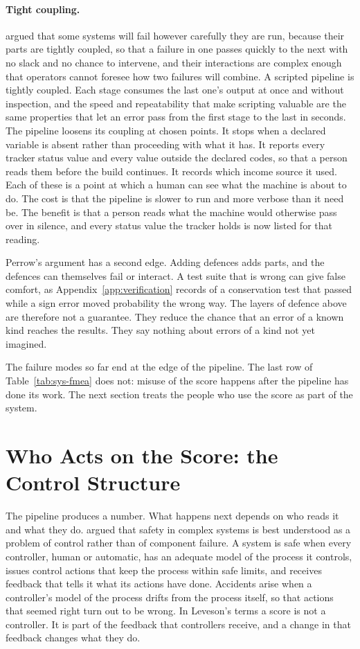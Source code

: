 \paragraph{Tight coupling.} \citet{perrow_1984} argued that some systems will
fail however carefully they are run, because their parts are tightly coupled,
so that a failure in one passes quickly to the next with no slack and no
chance to intervene, and their interactions are complex enough that operators
cannot foresee how two failures will combine. A scripted pipeline is tightly
coupled. Each stage consumes the last one's output at once and without
inspection, and the speed and repeatability that make scripting valuable are
the same properties that let an error pass from the first stage to the last
in seconds. The pipeline loosens its coupling at chosen points. It stops when
a declared variable is absent rather than proceeding with what it has. It
reports every tracker status value and every value outside the declared codes,
so that a person reads them before the build continues. It records which
income source it used. Each of these is a point at which a human can see what
the machine is about to do. The cost is that the pipeline is slower to run and
more verbose than it need be. The benefit is that a person reads what the
machine would otherwise pass over in silence, and every status value the
tracker holds is now listed for that reading.

Perrow's argument has a second edge. Adding defences adds parts, and the
defences can themselves fail or interact. A test suite that is wrong can give
false comfort, as Appendix~\ref{app:verification} records of a conservation
test that passed while a sign error moved probability the wrong way. The
layers of defence above are therefore not a guarantee. They reduce the chance
that an error of a known kind reaches the results. They say nothing about
errors of a kind not yet imagined.

The failure modes so far end at the edge of the pipeline. The last row of
Table~\ref{tab:sys-fmea} does not: misuse of the score happens after the
pipeline has done its work. The next section treats the people who use the
score as part of the system.

\section{Who Acts on the Score: the Control Structure}
\label{sec:sys-control}

The pipeline produces a number. What happens next depends on who reads it and
what they do. \citet{leveson_2011} argued that safety in complex systems is
best understood as a problem of control rather than of component failure.
A system is safe when every controller, human or automatic, has an adequate
model of the process it controls, issues control actions that keep the
process within safe limits, and receives feedback that tells it what its
actions have done. Accidents arise when a controller's model of the process
drifts from the process itself, so that actions that seemed right turn out to
be wrong. In Leveson's terms a score is not a controller. It is part of the
feedback that controllers receive, and a change in that feedback changes what
they do.

